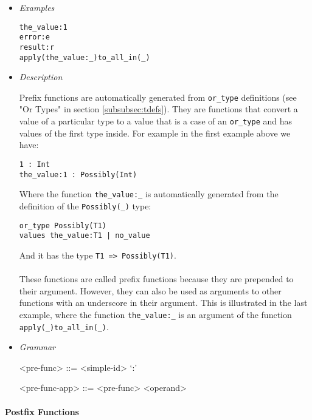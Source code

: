 \documentclass[diploma]{softlab-thesis}
\begin{document}
\begin{itemize}

\item \textit{Examples}
\begin{verbatim}
the_value:1
error:e
result:r
apply(the_value:_)to_all_in(_)
\end{verbatim}

\item \textit{Description}

Prefix functions are automatically generated from \verb|or_type| definitions
(see "Or Types" in section \ref{subsubsec:tdefs}). They are functions that
convert a value of a particular type to a value that is a case of an
\verb|or_type| and has values of the first type inside. For example in the
first example above we have:
\begin{verbatim}
1 : Int
the_value:1 : Possibly(Int)
\end{verbatim}
Where the function \verb|the_value:_| is automatically generated from the
definition of the \verb|Possibly(_)| type:
\begin{verbatim}
or_type Possibly(T1)
values the_value:T1 | no_value
\end{verbatim}
And it has the type \verb|T1 => Possibly(T1)|.
\\\\
These functions are called prefix functions because they are prepended to their
argument. However, they can also be used as arguments to other functions with
an underscore in their argument.  This is illustrated in the last example,
where the function \verb|the_value:_| is an argument of the function
\verb|apply(_)to_all_in(_)|.

\item \textit{Grammar}
\begin{grammar}
<pre-func> ::= <simple-id> `:'

<pre-func-app> ::= <pre-func> <operand>
\end{grammar}

\end{itemize}

\newpage
\paragraph{Postfix Functions}
\end{document}

